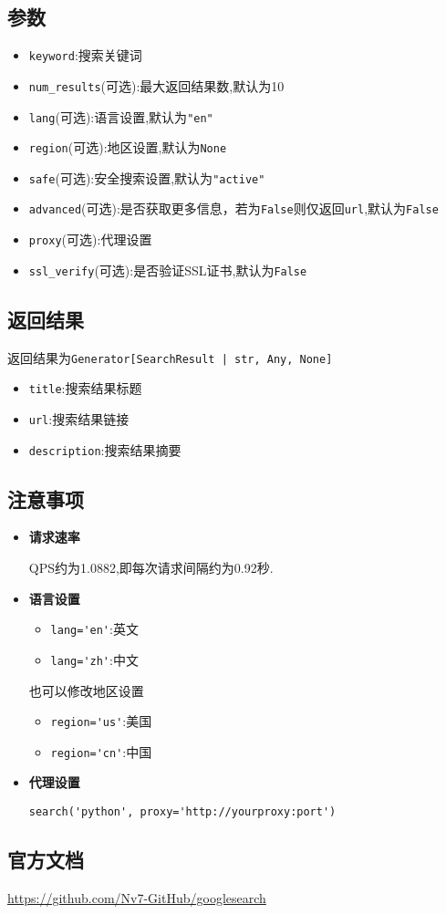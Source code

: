 \documentclass[a4paper,12pt]{article}
\begin{document}
\subsection{参数}
\begin{itemize}
    \item \verb|keyword|:搜索关键词
    \item \verb|num_results|(可选):最大返回结果数,默认为10
    \item \verb|lang|(可选):语言设置,默认为\verb|"en"|
    \item \verb|region|(可选):地区设置,默认为\verb|None|
    \item \verb|safe|(可选):安全搜索设置,默认为\verb|"active"|
    \item \verb|advanced|(可选):是否获取更多信息，若为\verb|False|则仅返回\verb|url|,默认为\verb|False|
    \item \verb|proxy|(可选):代理设置
    \item \verb|ssl_verify|(可选):是否验证SSL证书,默认为\verb|False|
\end{itemize}

\subsection{返回结果}
返回结果为\verb!Generator[SearchResult | str, Any, None]!
\begin{itemize}
    \item \verb|title|:搜索结果标题
    \item \verb|url|:搜索结果链接
    \item \verb|description|:搜索结果摘要
\end{itemize}

\subsection{注意事项}
\begin{itemize}
    \item \textbf{请求速率}
    
    QPS约为1.0882,即每次请求间隔约为0.92秒.
    \item \textbf{语言设置}
    \begin{itemize}
        \item \verb|lang='en'|:英文
        \item \verb|lang='zh'|:中文
    \end{itemize}
    也可以修改地区设置
    \begin{itemize}
        \item \verb|region='us'|:美国
        \item \verb|region='cn'|:中国
    \end{itemize}
    \item \textbf{代理设置}
    
    \verb|search('python', proxy='http://yourproxy:port')|
\end{itemize}
    
\subsection{官方文档}
\url{https://github.com/Nv7-GitHub/googlesearch}
\end{document}
